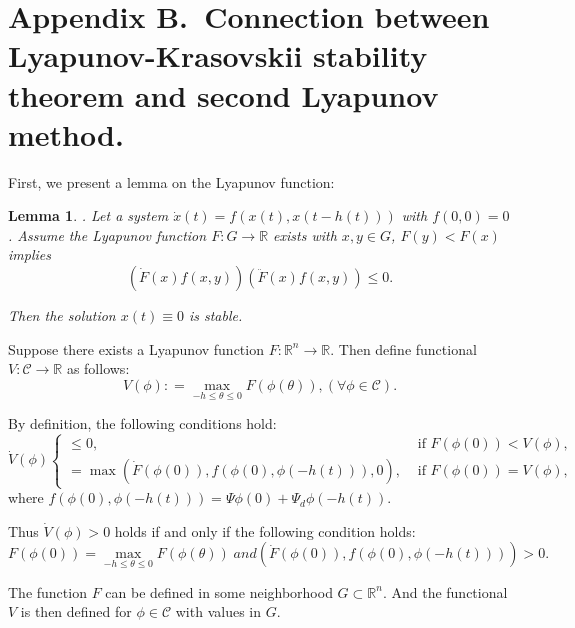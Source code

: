 \documentclass[a4paper]{cas-sc}
\newtheorem{lemma}[theorem]{Lemma}
\begin{document}
\section*{Appendix B.~Connection between Lyapunov-Krasovskii stability theorem and second Lyapunov method.}
\label{AppendixCCC}
First, we present a lemma on the Lyapunov function:
\begin{lemma}
  \label{lemmaYY}
  \citep{Kolmanovskii1999}. Let a system $\dot{x}(t)=f(x(t), x(t-h\left(t\right)))$ with $f\left(0,0 \right)= 0$. Assume the Lyapunov function $F:G\rightarrow\mathbb{R}$ exists with $x,y\in G$, $F\left(y\right)<F\left(x\right)$ implies
  \begin{equation}
    \left(\dot{F}\left(x\right)f\left(x,y\right)\right)\left(\ddot{F}\left(x\right)f\left(x,y\right)\right)\le0.
  \end{equation}

  Then the solution $x(t)\equiv0$ is stable.
\end{lemma}

Suppose there exists a Lyapunov function $F:\mathbb{R}^n\rightarrow\mathbb{R}$. Then define functional $V:\mathcal{C}\rightarrow\mathbb{R}$ as follows:
\begin{equation}
  V(\phi ): = \mathop {\max }\limits_{ - h \le \theta  \le 0} F(\phi (\theta )),(\forall \phi  \in \mathcal{C}).
  \label{yy1}
\end{equation}

By definition, the following conditions hold:
\begin{equation}
  \dot{V}(\phi)\left\{\begin{array}{cl}
    \leq 0,                                                          & \text { if } F(\phi(0))<V(\phi), \\
    =\max \left(\dot{F}(\phi(0)), f(\phi(0), \phi(-h(t))), 0\right), & \text { if } F(\phi(0))=V(\phi),
  \end{array}\right.
\end{equation}
where $f(\phi(0), \phi(-h(t)))=\Psi\phi(0)+\Psi_d\phi(-h(t))$.

Thus $\dot{V}\left(\phi\right)>0$ holds if and only if the following condition holds:
\begin{equation}
  F(\phi (0)) = \mathop {\max }\limits_{ - h \le \theta  \le 0} F(\phi (\theta ))\;and(\dot F(\phi (0)),f(\phi(0), \phi(-h(t)))) > 0.
  \label{yy3}
\end{equation}

The function $F$ can be defined in some neighborhood $G\subset\mathbb{R}^n$. And the functional $V$ is then defined for $\phi\in\mathcal{C}$ with values in $G$.
\end{document}
